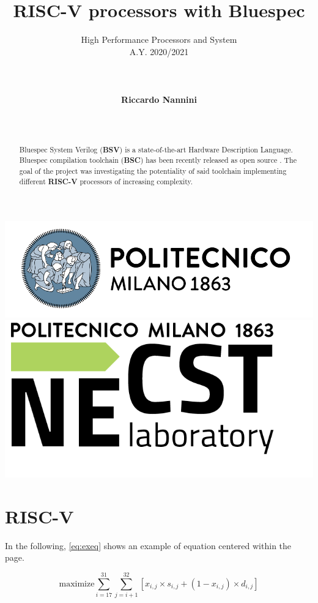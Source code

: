 \documentclass[12pt,oneside,a4paper]{article}
\title{\textbf{RISC-V processors with Bluespec}}
\author{High Performance Processors and System\\ A.Y. 2020/2021\\\\\\\\\textbf{Riccardo Nannini}\\\\\\}
\date{\parbox{\linewidth}{\centering%
		\today\endgraf\bigskip\bigskip\bigskip\bigskip\bigskip
		Tutors: Emanuele Del Sozzo, \endgraf\medskip
		Davide Conficconi \endgraf\bigskip\bigskip
		Professor: Marco Domenico Santambrogio 
		}}
\begin{document}
\begin{titlepage}
	\centering
	\clearpage
	\maketitle
	\thispagestyle{empty}
	\vspace*{1cm}
	\vfill
	\centering
	\includegraphics{logo_polimi.png}\includegraphics{logo_NECST.png}
\end{titlepage}

\tableofcontents
\newpage

\begin{abstract}
Bluespec System Verilog (\textbf{BSV}) is a state-of-the-art Hardware Description Language.
Bluespec compilation toolchain (\textbf{BSC}) has been recently released as open source \cite{bsc}. The goal of the project was investigating the potentiality of said toolchain implementing different \textbf{RISC-V} processors of increasing complexity.\\
\end{abstract}



\section{RISC-V} \label{sec:sec1}
In the following, \cref{eq:exeq} shows an example of equation centered within the page.

\begin{equation}\label{eq:exeq}
%
\mbox{maximize} \sum_{i=17}^{31} \sum_{j=i+1}^{32} [ x_{i,j} \times s_{i,j} + (1 - x_{i,j}) \times d_{i,j} ]
%
\end{equation}
\end{document}
